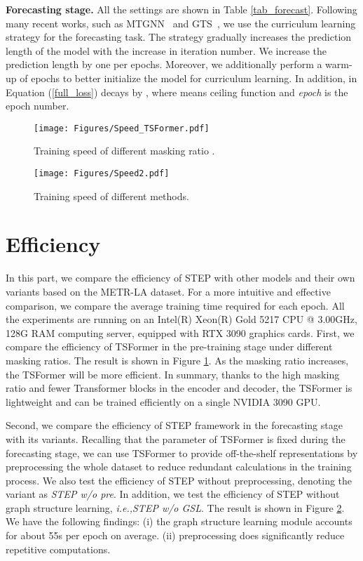 \documentclass[sigconf]{acmart}
\newcommand{\ie}{\textit{i.e.,}\xspace}
\begin{document}
\noindent \textbf{Forecasting stage.} 
All the settings are shown in Table \ref{tab_forecast}.
Following many recent works, such as MTGNN~\cite{2020MTGNN} and GTS~\cite{2021GTS}, we use the curriculum learning strategy for the forecasting task.
The strategy gradually increases the prediction length of the model with the increase in iteration number.
We increase the prediction length by one per  epochs.
Moreover, we additionally perform a warm-up of  epochs to better initialize the model for curriculum learning.
In addition,  in Equation (\ref{full_loss}) decays by , where  means ceiling function and \textit{epoch} is the epoch number.



\begin{figure}[ht]
    \setlength{\abovecaptionskip}{0.2cm}
\centering
  \texttt{[image: Figures/Speed\_TSFormer.pdf]}
  \caption{Training speed of different masking ratio .}
  \label{speed}
\end{figure}

\begin{figure}[ht]
    \setlength{\abovecaptionskip}{0.2cm}
\centering
  \texttt{[image: Figures/Speed2.pdf]}
  \caption{Training speed of different methods.}
  \label{speed2}
\end{figure}

\section{Efficiency}
\label{appendix_efficiency}
In this part, we compare the efficiency of STEP with other models and their own variants based on the METR-LA dataset.
For a more intuitive and effective comparison, we compare the average training time required for each epoch.
All the experiments are running on an Intel(R) Xeon(R) Gold 5217 CPU @ 3.00GHz, 128G RAM computing server, equipped with RTX 3090 graphics cards.
First, we compare the efficiency of TSFormer in the pre-training stage under different masking ratios.
The result is shown in Figure \ref{speed}.
As the masking ratio increases, the TSFormer will be more efficient.
In summary, thanks to the high masking ratio and fewer Transformer blocks in the encoder and decoder, the TSFormer is lightweight and can be trained efficiently on a single NVIDIA 3090 GPU.


Second, we compare the efficiency of STEP framework in the forecasting stage with its variants.
Recalling that the parameter of TSFormer is fixed during the forecasting stage, we can use TSFormer to provide off-the-shelf representations by preprocessing the whole dataset to reduce redundant calculations in the training process.
We also test the efficiency of STEP without preprocessing, denoting the variant as \textit{STEP w/o pre}.
In addition, we test the efficiency of STEP without graph structure learning, \ie \textit{STEP w/o GSL}.
The result is shown in Figure \ref{speed2}.
We have the following findings: 
(i) the graph structure learning module accounts for about 55s per epoch on average.
(ii) preprocessing does significantly reduce repetitive computations.
\end{document}
